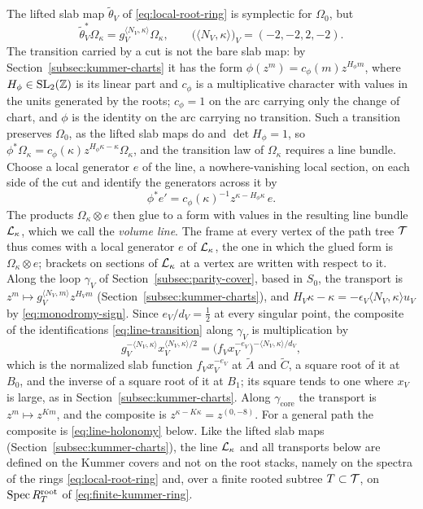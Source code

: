 The lifted slab map $\widetilde\theta_V$ of \eqref{eq:local-root-ring} is
symplectic for $\Omega_0$, but
\begin{equation}\label{eq:slab-conformal}
 \widetilde\theta_V^*\Omega_\kappa
 =g_V^{\langle N_V,\kappa\rangle}\Omega_\kappa,
 \qquad
 \bigl(\langle N_V,\kappa\rangle\bigr)_V=(-2,-2,2,-2).
\end{equation}
The transition carried by a cut is not the bare slab map: by
Section~\ref{subsec:kummer-charts} it has the form
$\phi(z^m)=c_\phi(m)z^{H_\phi m}$, where $H_\phi\in\mathrm{SL}_2(\mathbb Z)$ is its
linear part and $c_\phi$ is a multiplicative character with values in the
units generated by the roots; $c_\phi=1$ on the arc carrying only the change
of chart, and $\phi$ is the identity on the arc carrying no transition.
Such a transition preserves $\Omega_0$, as the lifted slab maps do and
$\det H_\phi=1$, so
$\phi^*\Omega_\kappa=c_\phi(\kappa)z^{H_\phi\kappa-\kappa}\Omega_\kappa$, and
the transition law of $\Omega_\kappa$ requires a line bundle.  Choose a
local generator $e$ of the line, a nowhere-vanishing local section, on each
side of the cut and identify the generators across it by
\begin{equation}\label{eq:line-transition}
 \phi^*e'=c_\phi(\kappa)^{-1}z^{\kappa-H_\phi\kappa}\,e.
\end{equation}
The products $\Omega_\kappa\otimes e$ then glue to a form with values in the
resulting line bundle $\mathcal L_\kappa$, which we call the \emph{volume line}.
The frame at every vertex of the path tree $\mathcal T$ thus comes with a local
generator $e$ of $\mathcal L_\kappa$, the one in which the glued form is
$\Omega_\kappa\otimes e$; brackets on sections of $\mathcal L_\kappa$ at a vertex
are written with respect to it.
Along the loop $\gamma_V$ of Section~\ref{subsec:parity-cover}, based in
$S_0$, the transport is $z^m\mapsto g_V^{\langle N_V,m\rangle}z^{H_Vm}$
(Section~\ref{subsec:kummer-charts}), and
$H_V\kappa-\kappa=-\epsilon_V\langle N_V,\kappa\rangle u_V$ by
\eqref{eq:monodromy-sign}.  Since $e_V/d_V=\frac12$ at every singular point,
the composite of the identifications \eqref{eq:line-transition} along
$\gamma_V$ is multiplication by
\[
 g_V^{-\langle N_V,\kappa\rangle}x_V^{\langle N_V,\kappa\rangle/2}
 =\bigl(f_Vx_V^{-e_V}\bigr)^{-\langle N_V,\kappa\rangle/d_V},
\]
which is the normalized slab function $f_Vx_V^{-e_V}$ at $\widetilde A$ and
$\widetilde C$, a square root of it at $B_0$, and the inverse of a square
root of it at $B_1$; its square tends to one where $x_V$ is large, as in
Section~\ref{subsec:kummer-charts}.  Along
$\gamma_{\mathrm{core}}$ the transport is $z^m\mapsto z^{Km}$, and the
composite is $z^{\kappa-K\kappa}=z^{(0,-8)}$.  For a general path the
composite is \eqref{eq:line-holonomy} below.  Like the lifted slab maps
(Section~\ref{subsec:kummer-charts}), the line $\mathcal L_\kappa$ and all
transports below are defined on the Kummer covers and not on the root
stacks, namely on the spectra of the rings \eqref{eq:local-root-ring} and,
over a finite rooted subtree $T\subset\mathcal T$, on $\operatorname{Spec} R_T^{\mathrm{root}}$
of \eqref{eq:finite-kummer-ring}.

